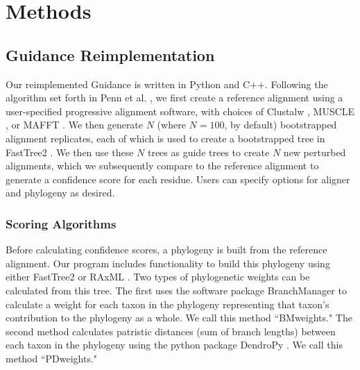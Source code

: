 \documentclass[10pt]{article}
\begin{document}
\section*{Methods}

\subsection*{Guidance Reimplementation}
Our reimplemented Guidance is written in Python and C++. Following the algorithm set forth in Penn et al. \citep{Penn2010}, we first create a reference alignment using a user-specified progressive alignment software, with choices of Clustalw \citep{Thompson1994}, MUSCLE \citep{Edgar2004}, or MAFFT \citep{Katoh2002, Katoh2005}. We then generate $N$ (where $N=100$, by default) bootstrapped alignment replicates, each of which is used to create a bootstrapped tree in FastTree2 \citep{Price2010}. We then use these $N$ trees as guide trees to create $N$ new perturbed alignments, which we subsequently compare to the reference alignment to generate a confidence score for each residue. Users can specify options for aligner and phylogeny as desired.

\subsubsection*{Scoring Algorithms}
Before calculating confidence scores, a phylogeny is built from the reference alignment. Our program includes functionality to build this phylogeny using either FastTree2 \citep{Price2010} or RAxML \citep{Stamatakis2006}. Two types of phylogenetic weights can be calculated from this tree. The first uses the software package BranchManager \citep{Stone2007} to calculate a weight for each taxon in the phylogeny representing that taxon's contribution to the phylogeny as a whole. We call this method ``BMweights." The second method calculates patristic distances (sum of branch lengths) between each taxon in the phylogeny using the python package DendroPy \citep{Sukumaran2010}. We call this method ``PDweights."
\end{document}
